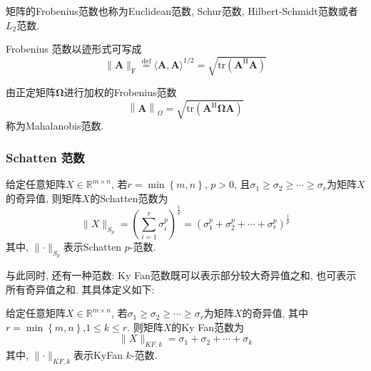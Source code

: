 \documentclass[lang=cn,10pt]{gorgeousnbook}
\numberwithin{equation}{section}%
\numberwithin{figure}{section}%
\begin{document}
\begin{note}
矩阵的Frobenius范数也称为Euclidean范数, Schur范数, Hilbert-Schmidt范数或者$L_2$范数. 
\end{note}

Frobenius 范数以迹形式可写成
\begin{equation}
\|\boldsymbol{A}\|_{\mathrm{F}}\stackrel{\mathrm{def}}{=}\langle\boldsymbol{A},\boldsymbol{A}\rangle^{1/2}=\sqrt{\mathrm{tr}\left(\boldsymbol{A}^{\mathrm{H}}\boldsymbol{A}\right)}
\end{equation}

由正定矩阵$\boldsymbol{\Omega}$进行加权的Frobenius范数
\begin{equation}
\left\|\boldsymbol{A}\right\|_{\Omega}=\sqrt{\mathrm{tr}(\boldsymbol{A}^\mathrm{H}\boldsymbol{\Omega}\boldsymbol{A})}
\end{equation}
称为Mahalanobis范数. 
\subsubsection{Schatten 范数}
\begin{definition}
给定任意矩阵$X\in \mathbb{R}^{m\times n}$, 若$r=\min \left\{ m,n \right\} $, $p>0$, 且$\sigma _1\ge \sigma _2\ge \cdots \ge \sigma _r$为矩阵$X$的奇异值, 则矩阵$X$的Schatten范数为
\begin{equation}
\lVert X \rVert _{S_p}=\left( \sum_{i=1}^r{\sigma _{i}^{p}} \right) ^{\frac{1}{p}}=\left( \sigma _{1}^{p}+\sigma _{2}^{p}+\cdots +\sigma _{r}^{p} \right) ^{\frac{1}{p}}
\end{equation}
其中, $\lVert \cdot \rVert _{S_p}$表示Schatten $p$-范数. 
\end{definition}

与此同时, 还有一种范数: Ky Fan范数既可以表示部分较大奇异值之和, 也可表示所有奇异值之和. 其具体定义如下:
\begin{definition}
给定任意矩阵$X\in \mathbb{R}^{m\times n}$, 若$\sigma _1\ge \sigma _2\ge \cdots \ge \sigma _r$为矩阵$X$的奇异值, 其中$r=\min \left\{ m,n \right\} $,$1\le k\le r$. 则矩阵$X$的Ky Fan范数为
\begin{equation}
\lVert X \rVert _{KF,k}=\sigma _1+\sigma _2+\cdots +\sigma _k
\end{equation}
其中, $\lVert \cdot \rVert _{KF,k}$表示KyFan $k$-范数. 
\end{definition}
\end{document}
